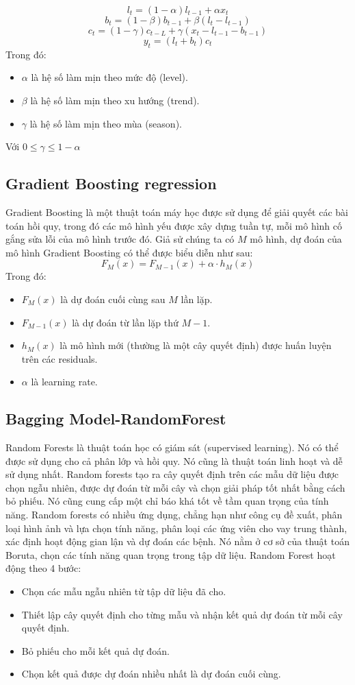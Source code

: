\documentclass[conference]{IEEEtran}
\begin{document}
\[
l_{t} = (1 - \alpha)l_{t - 1} + \alpha x_{t}
\]
\[
b_{t} = (1 - \beta)b_{t - 1} + \beta (l_{t} - l_{t - 1})
\]
\[
c_{t} = (1 - \gamma)c_{t - L} + \gamma (x_{t} - l_{t - 1} - b_{t - 1})
\]
\[
y_{t} = (l_{t} + b_{t})c_{t}
\]
Trong đó:
\begin{itemize}
    \item \(\alpha\) là hệ số làm mịn theo mức độ (level).
    \item \(\beta\) là hệ số làm mịn theo xu hướng (trend).
    \item \(\gamma\) là hệ số làm mịn theo mùa (season).
\end{itemize}
Với \(0 \leq \gamma \leq 1-\alpha\)

\subsection{Gradient Boosting regression}
Gradient Boosting là một thuật toán máy học được sử dụng để giải quyết các bài toán hồi quy, trong đó các mô hình yếu được xây dựng tuần tự, mỗi mô hình cố gắng sửa lỗi của mô hình trước đó. 
Giả sử chúng ta có $M$ mô hình, dự đoán của mô hình Gradient Boosting có thể được biểu diễn như sau:
\[
F_M(x) = F_{M-1}(x) + \alpha \cdot h_M(x)
\]
Trong đó:
\begin{itemize}
    \item $F_M(x)$ là dự đoán cuối cùng sau $M$ lần lặp.
    \item $F_{M-1}(x)$ là dự đoán từ lần lặp thứ $M-1$.
    \item $h_M(x)$ là mô hình mới (thường là một cây quyết định) được huấn luyện trên các residuals.
    \item $\alpha$ là learning rate.
\end{itemize}

\subsection{Bagging Model-RandomForest}
Random Forests là thuật toán học có giám sát (supervised learning). Nó có thể được sử dụng cho cả phân lớp và hồi quy. Nó cũng là thuật toán linh hoạt và dễ sử dụng nhất. Random forests tạo ra cây quyết định trên các mẫu dữ liệu được chọn ngẫu nhiên, được dự đoán từ mỗi cây và chọn giải pháp tốt nhất bằng cách bỏ phiếu. Nó cũng cung cấp một chỉ báo khá tốt về tầm quan trọng của tính năng. Random forests có nhiều ứng dụng, chẳng hạn như công cụ đề xuất, phân loại hình ảnh và lựa chọn tính năng, phân loại các ứng viên cho vay trung thành, xác định hoạt động gian lận và dự đoán các bệnh. Nó nằm ở cơ sở của thuật toán Boruta, chọn các tính năng quan trọng trong tập dữ liệu.
Random Forest hoạt động theo 4 bước:
\begin{itemize}
    \item Chọn các mẫu ngẫu nhiên từ tập dữ liệu đã cho.
    \item Thiết lập cây quyết định cho từng mẫu và nhận kết quả dự đoán từ mỗi cây quyết định.
    \item Bỏ phiếu cho mỗi kết quả dự đoán.
    \item Chọn kết quả được dự đoán nhiều nhất là dự đoán cuối cùng.
\end{itemize}
\end{document}
